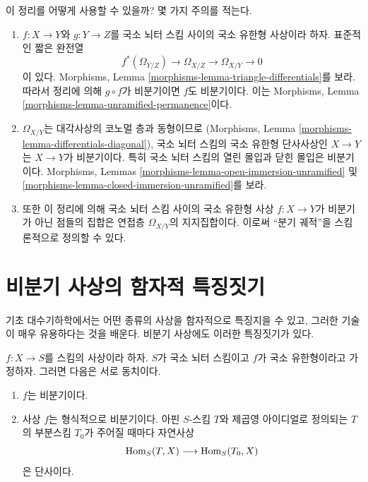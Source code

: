 \noindent
이 정리를 어떻게 사용할 수 있을까? 몇 가지 주의를 적는다.
\begin{enumerate}
\item $f : X \to Y$와 $g : Y \to Z$를 국소 뇌터 스킴 사이의
국소 유한형 사상이라 하자. 표준적인 짧은 완전열
$$
f^*(\Omega_{Y/Z}) \to \Omega_{X/Z} \to \Omega_{X/Y} \to 0
$$
이 있다. Morphisms, Lemma
\ref{morphisms-lemma-triangle-differentials}를 보라. 따라서 정리에
의해 $g \circ f$가 비분기이면 $f$도 비분기이다. 이는 Morphisms,
Lemma \ref{morphisms-lemma-unramified-permanence}이다.
\item $\Omega_{X/Y}$는 대각사상의 코노멀 층과 동형이므로
(Morphisms, Lemma \ref{morphisms-lemma-differentials-diagonal}),
국소 뇌터 스킴의 국소 유한형 단사사상인 $X \to Y$는
$X \to Y$가 비분기이다.
특히 국소 뇌터 스킴의 열린 몰입과 닫힌 몰입은 비분기이다.
Morphisms, Lemmas
\ref{morphisms-lemma-open-immersion-unramified} 및
\ref{morphisms-lemma-closed-immersion-unramified}를 보라.
\item 또한 이 정리에 의해 국소 뇌터 스킴 사이의 국소 유한형 사상
$f : X \to Y$가 비분기가 아닌 점들의 집합은 연접층
$\Omega_{X/Y}$의 지지집합이다. 이로써 “분기 궤적”을 스킴론적으로
정의할 수 있다.
\end{enumerate}

\section{비분기 사상의 함자적 특징짓기}
\label{section-functorial-unramified}

\noindent
기초 대수기하학에서는 어떤 종류의 사상을 함자적으로 특징지을 수 있고,
그러한 기술이 매우 유용하다는 것을 배운다.
비분기 사상에도 이러한 특징짓기가 있다.

\begin{theorem}
\label{theorem-formally-unramified}
$f : X \to S$를 스킴의 사상이라 하자.
$S$가 국소 뇌터 스킴이고 $f$가 국소 유한형이라고 가정하자.
그러면 다음은 서로 동치이다.
\begin{enumerate}
\item $f$는 비분기이다.
\item 사상 $f$는 형식적으로 비분기이다.
아핀 $S$-스킴 $T$와 제곱영 아이디얼로 정의되는 $T$의 부분스킴
$T_0$가 주어질 때마다 자연사상
$$
\mathop{\mathrm{Hom}}\nolimits_S(T, X) \longrightarrow \mathop{\mathrm{Hom}}\nolimits_S(T_0, X)
$$
은 단사이다.
\end{enumerate}
\end{theorem}

